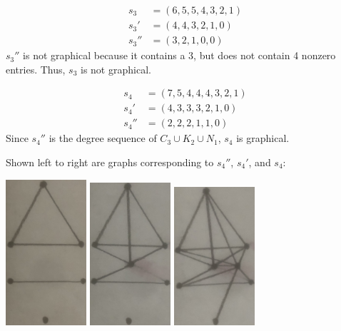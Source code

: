 \documentclass[12pt]{article}
\begin{document}
\begin{align*}
    s_3    &= (6,5,5,4,3,2,1) \\
    s_3'   &=   (4,4,3,2,1,0) \\
    s_3''  &=     (3,2,1,0,0)
\end{align*}
$s_3''$ is not graphical because it contains a 3, but does not contain 4 nonzero entries.
Thus, $s_3$ is not graphical.

\begin{align*}
    s_4   &= (7,5,4,4,4,3,2,1) \\
    s_4'  &=   (4,3,3,3,2,1,0) \\
    s_4'' &=     (2,2,2,1,1,0)
\end{align*} Since $s_4''$ is the degree sequence of $C_3 \cup K_2 \cup N_1$, $s_4$ is graphical.

Shown left to right are graphs corresponding to $s_4''$, $s_4'$, and $s_4$:
\begin{center}
\includegraphics[width=3cm]{IMG-0783.JPG}
\includegraphics[width=3cm]{IMG-0784.JPG}
\includegraphics[width=3cm]{IMG-0785.JPG}
\end{center}
\end{document}
